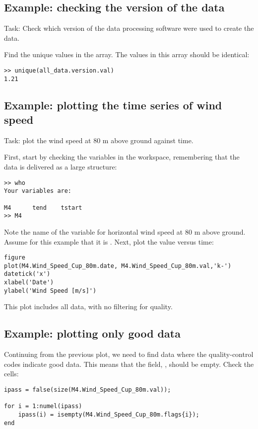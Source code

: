 \subsection{Example: checking the version of the data}
Task: Check which version of the data processing software were used to create the data.

Find the unique values in the  array. The values in this array should be identical:
\begin{lstlisting}
>> unique(all_data.version.val)
1.21
\end{lstlisting}

\subsection{Example: plotting the time series of wind speed}
Task: plot the wind speed at 80 m above ground against time. 

First, start by checking the variables in the workspace, remembering that the data is delivered as a large structure:

\begin{lstlisting}
>> who
Your variables are:

M4      tend    tstart 
>> M4
\end{lstlisting}

Note the name of the variable for horizontal wind speed at 80 m above ground. Assume for this example that it is . Next, plot the value versus time:

\begin{lstlisting}
figure
plot(M4.Wind_Speed_Cup_80m.date, M4.Wind_Speed_Cup_80m.val,'k-')
datetick('x')
xlabel('Date')
ylabel('Wind Speed [m/s]')
\end{lstlisting}

This plot includes all data, with no filtering for quality.

\subsection{Example: plotting only good data}
Continuing from the previous plot, we need to find data where the quality-control codes indicate good data. This means that the field, , should be empty. Check the cells:

\begin{lstlisting}
ipass = false(size(M4.Wind_Speed_Cup_80m.val));

for i = 1:numel(ipass)
    ipass(i) = isempty(M4.Wind_Speed_Cup_80m.flags{i});
end
\end{lstlisting}

